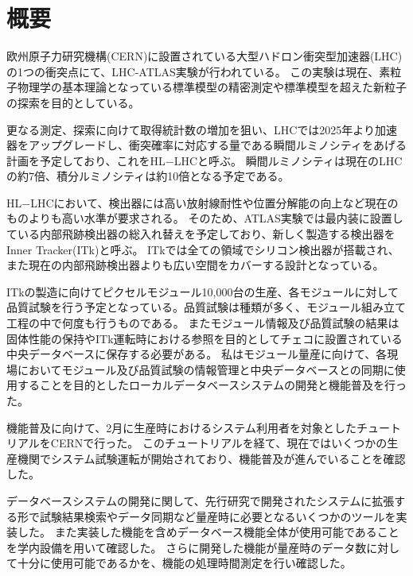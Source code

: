 \chapter*{概要}

欧州原子力研究機構(CERN)に設置されている大型ハドロン衝突型加速器(LHC)の1つの衝突点にて、LHC-ATLAS実験が行われている。
この実験は現在、素粒子物理学の基本理論となっている標準模型の精密測定や標準模型を超えた新粒子の探索を目的としている。

更なる測定、探索に向けて取得統計数の増加を狙い、LHCでは2025年より加速器をアップグレードし、衝突確率に対応する量である瞬間ルミノシティをあげる計画を予定しており、これをHL$-$LHCと呼ぶ。
瞬間ルミノシティは現在のLHCの約7倍、積分ルミノシティは約10倍となる予定である。

HL$-$LHCにおいて、検出器には高い放射線耐性や位置分解能の向上など現在のものよりも高い水準が要求される。
そのため、ATLAS実験では最内装に設置している内部飛跡検出器の総入れ替えを予定しており、新しく製造する検出器をInner Tracker(ITk)と呼ぶ。
ITkでは全ての領域でシリコン検出器が搭載され、また現在の内部飛跡検出器よりも広い空間をカバーする設計となっている。

ITkの製造に向けてピクセルモジュール10,000台の生産、各モジュールに対して品質試験を行う予定となっている。品質試験は種類が多く、モジュール組み立て工程の中で何度も行うものである。
またモジュール情報及び品質試験の結果は固体性能の保持やITk運転時における参照を目的としてチェコに設置されている中央データベースに保存する必要がある。
私はモジュール量産に向けて、各現場においてモジュール及び品質試験の情報管理と中央データベースとの同期に使用することを目的としたローカルデータベースシステムの開発と機能普及を行った。

機能普及に向けて、2月に生産時におけるシステム利用者を対象としたチュートリアルをCERNで行った。
このチュートリアルを経て、現在ではいくつかの生産機関でシステム試験運転が開始されており、機能普及が進んでいることを確認した。

データベースシステムの開発に関して、先行研究で開発されたシステムに拡張する形で試験結果検索やデータ同期など量産時に必要となるいくつかのツールを実装した。
また実装した機能を含めデータベース機能全体が使用可能であることを学内設備を用いて確認した。
さらに開発した機能が量産時のデータ数に対して十分に使用可能であるかを、機能の処理時間測定を行い確認した。


